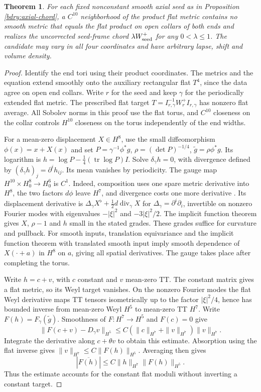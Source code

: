 \documentclass[11pt]{article}
\numberwithin{equation}{section}
\newtheorem{theorem}{Theorem}[section]
\theoremstyle{definition}
\theoremstyle{remark}
\begin{document}
\begin{theorem}\label{bdry:unrestricted-near-flat}
For each fixed nonconstant smooth axial seed as in Proposition
\ref{bdry:axial-chord}, a \(C^{10}\) neighborhood of the product flat
metric contains no smooth metric that equals the flat product on open
collars of both ends and realizes the uncorrected seed-frame chord
\(\lambda W_{\rm seed}^+\) for any \(0<\lambda\le1\). The candidate
may vary in all four coordinates and have arbitrary lapse, shift and
volume density.
\end{theorem}
\begin{proof}
Identify the end tori using their product coordinates. The metrics
and the equation extend smoothly onto the auxiliary rectangular
flat \(T^4\), since the data agree on open end collars. Write \(r\)
for the seed and keep \(\gamma\) for the periodically extended flat
metric. The prescribed flat target \(T=I_{r,\gamma}^{-1}W_r^+I_{r,\gamma}\)
has nonzero flat average. All Sobolev norms in this proof use the
flat torus, and \(C^{10}\) closeness on the collar controls
\(H^{10}\) closeness on the torus independently of the end widths.

For a mean-zero displacement \(X\in H^8\), use the small diffeomorphism
\(\phi(x)=x+X(x)\) and set \(P=\gamma^{-1}\phi^*g\),
\(\rho=(\det P)^{-1/4}\), \(\widetilde g=\rho\phi^*g\).
Its logarithm is \(h=\log P-\tfrac14(\operatorname{tr}\log P)I\).
Solve \(\delta_\gamma h=0\), with divergence defined by
\((\delta_\gamma h)_j=\partial^i h_{ij}\). Its mean vanishes by periodicity.
The gauge map \(H^{10}\times H^8_0\to H^6_0\) is \(C^1\). Indeed, composition uses one spare metric derivative into \(H^8\), the two
factors \(d\phi\) leave \(H^7\), and divergence costs one more derivative
\cite[Theorem 1.2]{InciKappelerTopalov2012Composition}.
Its displacement derivative is
\(\Delta_\gamma X^\flat+\tfrac12d\operatorname{div}_\gamma X\) for
\(\Delta_\gamma=\partial^i\partial_i\), invertible on nonzero Fourier
modes with eigenvalues \(-|\xi|^2\) and \(-3|\xi|^2/2\). The implicit
function theorem gives \(X\), \(\rho-1\) and \(h\) small in the stated
grades. These grades suffice for curvature and pullback. For smooth
inputs, translation equivariance
and the implicit function theorem with translated smooth input imply
smooth dependence of \(X(\cdot+a)\) in \(H^8\) on \(a\), giving all
spatial derivatives. The gauge takes place after completing the torus.

Write \(h=c+v\), with \(c\) constant and \(v\) mean-zero TT. The
constant matrix gives a flat metric, so its Weyl target vanishes.
On the nonzero Fourier modes the flat Weyl derivative maps TT tensors
isometrically up to the factor \(|\xi|^2/4\), hence has bounded
inverse from mean-zero Weyl \(H^5\) to mean-zero TT \(H^7\).
Write \(F(h)=F_\gamma(\widetilde g)\). Smoothness of \(F:H^7\to H^5\)
and \(F(c)=0\) give
\[
 \|F(c+v)-D_\gamma v\|_{H^5}
 \le C(\|c\|_{H^7}+\|v\|_{H^7})\|v\|_{H^7}.
\]
Integrate the derivative along \(c+\theta v\) to obtain this estimate.
Absorption using the flat inverse gives
\(\|v\|_{H^7}\le C\|F(h)\|_{H^5}\). Averaging then gives
\[
 |\overline{F(h)}|\le C\|h\|_{H^7}\|F(h)\|_{H^5}.
\]
Thus the estimate accounts for the constant flat moduli without
inverting a constant target.


\end{proof}
\end{document}
